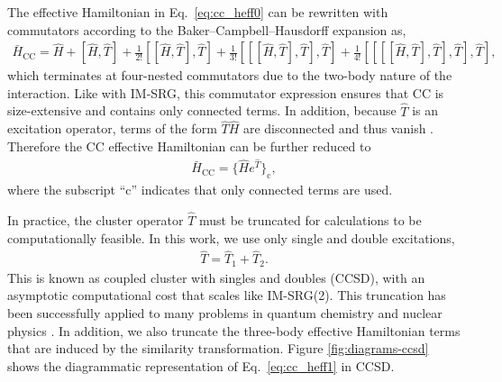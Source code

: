The effective Hamiltonian in Eq.\ \eqref{eq:cc_heff0} can be rewritten with commutators according to the Baker--Campbell--Hausdorff expansion as,
\begin{align*}
  \bar{H}_{\mathrm{CC}} = \hat{H} + [\hat{H}, \hat{T}] + \frac{1}{2!} [[\hat{H}, \hat{T} ], \hat{T}] + \frac{1}{3!} [[[\hat{H}, \hat{T}], \hat{T}], \hat{T}] + \frac{1}{4!} [[[[\hat{H}, \hat{T}], \hat{T}], \hat{T}], \hat{T}],
\end{align*}
which terminates at four-nested commutators due to the two-body nature of the interaction.  Like with IM-SRG, this commutator expression ensures that CC is size-extensive and contains only connected terms.  In addition, because $\hat{T}$ is an excitation operator, terms of the form $\hat{T} \hat{H}$ are disconnected and thus vanish \cite{shavitt2009many}.  Therefore the CC effective Hamiltonian can be further reduced to
\begin{align} \label{eq:cc_heff1}
  \bar{H}_{\mathrm{CC}} = \bigl\{\hat{H}e^{\hat{T}}\bigr\}_{\mathrm{c}},
\end{align}
where the subscript ``$\mathrm{c}$'' indicates that only connected terms are used.

In practice, the cluster operator $\hat{T}$ must be truncated for calculations to be computationally feasible.  In this work, we use only single and double excitations,
\begin{align*}
  \hat{T} = \hat{T}_1 + \hat{T}_2.
\end{align*}
This is known as coupled cluster with singles and doubles (CCSD), with an asymptotic computational cost that scales like IM-SRG(2).  This truncation has been successfully applied to many problems in quantum chemistry \cite{RevModPhys.79.291} and nuclear physics \cite{0034-4885-77-9-096302}.  In addition, we also truncate the three-body effective Hamiltonian terms that are induced by the similarity transformation.  Figure \ref{fig:diagrams-ccsd} shows the diagrammatic representation of Eq.\ \eqref{eq:cc_heff1} in CCSD.

